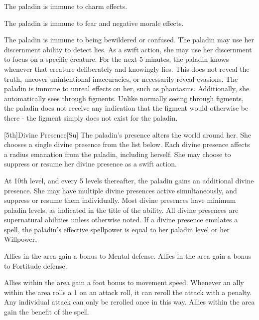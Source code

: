 The paladin is immune to charm effects.

The paladin is immune to fear and negative morale effects.

The paladin is immune to being bewildered or confused.
The paladin may use her discernment ability to detect lies.
As a swift action, she may use her discernment to focus on a specific creature.
For the next 5 minutes, the paladin knows whenever that creature deliberately and knowingly lies.
This does not reveal the truth, uncover unintentional inaccuracies, or necessarily reveal evasions.
The paladin is immune to unreal effects on her, such as phantasms.
Additionally, she automatically sees through figments.
Unlike normally seeing through figments, the paladin does not receive any indication that the figment would otherwise be there - the figment simply does not exist for the paladin.

[5th]{Divine Presence}[Su]
The paladin's presence alters the world around her.
She chooses a single divine presence from the list below.
Each divine presence affects a \arealarge radius emanation from the paladin, including herself.
She may choose to suppress or resume her divine presence as a swift action.

At 10th level, and every 5 levels thereafter, the paladin gains an additional divine presence.
She may have multiple divine presences active simultaneously, and suppress or resume them individually.
Most divine presences have minimum paladin levels, as indicated in the title of the ability.
All divine presences are supernatural abilities unless otherwise noted.
If a divine presence emulates a spell, the paladin's effective spellpower is equal to her paladin level or her Willpower.

Allies in the area gain a  bonus to Mental defense.
Allies in the area gain a  bonus to Fortitude defense.

Allies within the area gain a  foot bonus to movement speed.
Whenever an ally within the area rolls a 1 on an attack roll, it can reroll the attack with a  penalty.
Any individual attack can only be rerolled once in this way.
 Allies within the area gain the benefit of the 
spell.

